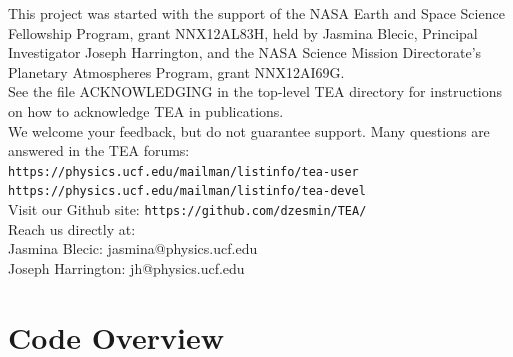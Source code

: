 \begin{center}
\begin{minipage}{.8\textwidth}
This project was started with the support of the NASA Earth and            
Space Science Fellowship Program, grant NNX12AL83H, held by                
Jasmina Blecic, Principal Investigator Joseph Harrington, and the          
NASA Science Mission Directorate’s Planetary Atmospheres Program,          
grant NNX12AI69G.     \\                                                     
                                                                           
See the file ACKNOWLEDGING in the top-level TEA directory for              
instructions on how to acknowledge TEA in publications.  \\                  
                                                                           
We welcome your feedback, but do not guarantee support.                    
Many questions are answered in the TEA forums:   \\                          
                                                                          
{\tt https://physics.ucf.edu/mailman/listinfo/tea-user}                          
{\tt https://physics.ucf.edu/mailman/listinfo/tea-devel}   \\                      
                                                                           
Visit our Github site:                               
{\tt https://github.com/dzesmin/TEA/}   \\                                         
                                                                           
Reach us directly at:                                                      
\\ Jasmina Blecic: jasmina@physics.ucf.edu 
\\ Joseph Harrington: jh@physics.ucf.edu \\                                     

\end{minipage}
\end{center}
\vfill %


\tableofcontents
\newpage
\section{Code Overview}

